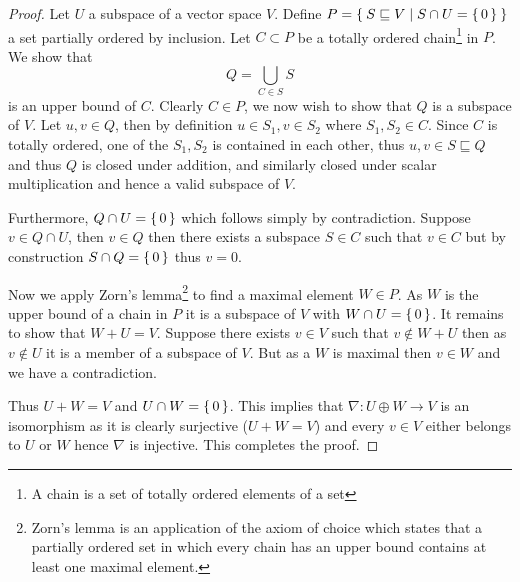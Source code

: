 \documentclass[12pt]{extarticle}
\renewcommand{\to}[0]{\longrightarrow}
\begin{document}
\begin{proof}
  Let $U$ a subspace of a vector space $V$. Define $P = \Set{ S \sqsubseteq V \mid S \cap U = \set{0} }$ a set partially ordered by inclusion. Let $C \subset P$ be a totally ordered chain\footnote{A chain is a set of totally ordered elements of a set} in $P$. We show that  
  \[
    Q = \bigcup_{C \in S} S
  \]
  is an upper bound of $C$. Clearly $C \in P$, we now wish to show that $Q$ is a subspace of $V$. Let $u, v \in Q$, then by definition $u \in S_1, v \in S_2$ where $S_1, S_2 \in C$. Since $C$ is totally ordered, one of the $S_1, S_2$ is contained in each other, thus $u, v \in S \sqsubseteq Q$ and thus $Q$ is closed under addition, and similarly closed under scalar multiplication and hence a valid subspace of $V$.
  
  Furthermore, $Q \cap U = \set{0}$ which follows simply by contradiction. Suppose $v \in Q \cap U$, then $v \in Q$ then there exists a subspace $S \in C$ such that $v \in C$ but by construction $S \cap Q = \set{0}$ thus $v = 0$.
  
  Now we apply Zorn's lemma\footnote{Zorn's lemma is an application of the axiom of choice which states that a partially ordered set in which every chain has an upper bound contains at least one maximal element. } to find a maximal element $W \in P$. As $W$ is the upper bound of a chain in $P$ it is a subspace of $V$ with $W \cap U = \set{0}$. It remains to show that $W + U = V$. Suppose there exists $v \in V$ such that $v \notin W + U$ then as $v \notin U$ it is a member of a subspace of $V$. But as a $W$ is maximal then $v \in W$ and we have a contradiction. 
  
  Thus $U + W = V$ and $U \cap W = \set{0}$. This implies that $\nabla: U \oplus W \to V$ is an isomorphism as it is clearly surjective ($U + W = V$) and every $v \in V$ either belongs to $U$ or $W$ hence $\nabla$ is injective. This completes the proof.
\end{proof}
\end{document}
